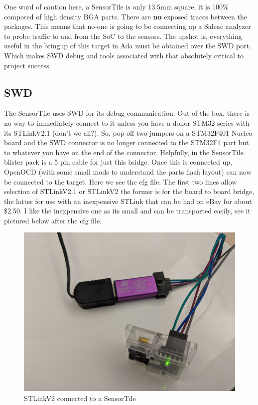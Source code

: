 \documentclass[11pt]{article}
\numberwithin{figure}{section}
\begin{document}
One word of caution here, a SensorTile is only 13.5mm square, it
is 100\% composed of high density BGA parts. There are
\textcolor[rgb]{1.0,0.0,0.0}{\textbf{no}} exposed traces between the packages. This means that no-one is going
to be connecting up a Saleae analyzer to probe traffic to and from the
SoC to the sensors. The upshot is, everything useful in the bringup of
this target in Ada must be obtained over the SWD port. Which makes SWD
debug and tools associated with that absolutely critical to project
success.
\subsection{SWD}
The SensorTile uses SWD for its debug communication. Out of the box,
there is no way to immediately connect to it unless you have a donor
STM32 series with its STLinkV2.1 (don't we all?). So, pop off two
jumpers on a STM32F401 Nucleo board and the SWD connector is no longer
connected to the STM32F4 part but to whatever you have on the end of
the connector. Helpfully, in the SensorTile blister pack is a 5 pin
cable for just this bridge. Once this is connected up, OpenOCD (with
some small mods to understand the parts flash layout) can now be
connected to the target. Here we see the cfg file. The first two lines
allow selection of STLinkV2.1 or STLinkV2 the former is for the board
to board bridge, the latter for use with an inexpensive STLink that
can be had on eBay for about \$2.50. I like the inexpensive one as its
small and can be transported easily, see it pictured below after the
cfg file.

{
\selectfont

}

\begin{figure}[!htbp] %
\centering
\includegraphics[scale=0.1]{STLinkV2.jpg}
\caption{STLinkV2 connected to a SensorTile}
\label{Figure:STLinkV2}
\end{figure}
\end{document}
